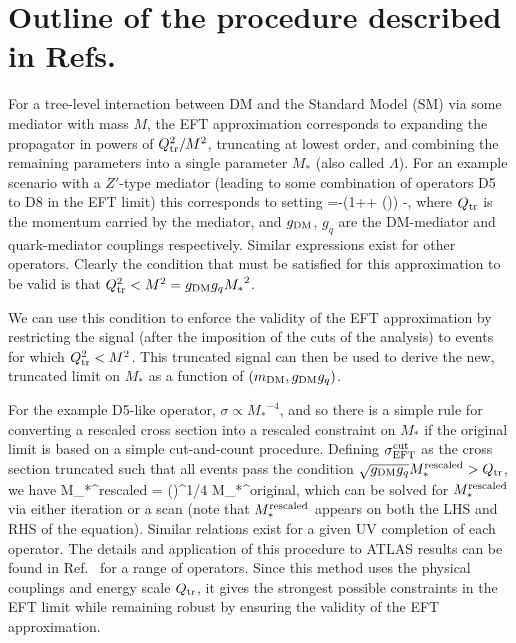 \section*{Outline of the procedure described in Refs.~\cite{Busoni:2014sya,Aad:2015zva}}

For a tree-level interaction between DM and the Standard Model (SM) via some mediator with mass $M$, the EFT approximation corresponds to expanding the propagator 
in powers of $Q_{\rm tr}^2/M^2$, truncating at lowest order, and combining the remaining parameters into a single parameter ${M_*}$ (also called $\Lambda$). For an example scenario with a $Z'$-type mediator (leading to some combination of operators D5 to D8 in the EFT limit)
this corresponds to setting
%
\be
{}=-\left(1++  \left(\right)\right) \simeq -,
\ee
%
where $Q_{\rm tr}$ is the momentum carried by the mediator, and $g_{\rm DM}$, $g_q$ are the DM-mediator and quark-mediator couplings respectively. Similar expressions exist for other operators. Clearly the condition that must be satisfied for this approximation to be valid is that $Q_{\rm tr}^2 < M^2 = g_{\rm DM} g_q {M_*}^2$. 

We can use this condition to enforce the validity of the EFT approximation by restricting the signal (after the imposition of the cuts of the analysis) to events for which $Q_{\rm tr}^2 < M^2$. This truncated signal can then be used to derive the new, truncated limit on $M_*$ as a function of $(m_{\rm DM}, g_{\rm DM} g_q)$.

For the example D5-like operator, $\sigma \propto {M_*}^{-4}$, and so there is a simple rule for converting a rescaled cross section into a rescaled constraint on ${M_*}$ if the original limit is based on a simple cut-and-count procedure. Defining $\sigma_{\rm EFT}^{\rm cut}$ as the cross section truncated such that all events pass the condition $\sqrt{g_{\rm DM} g_q} M_*^{\rm rescaled} > Q_{\rm tr}$, we have
%
\be
M_*^{\rm rescaled} = \left(\right)^{1/4} M_*^{\rm original},
\ee
%
which can be solved for $M_*^{\rm rescaled}$ via either iteration or a scan (note that $M_*^{\rm rescaled}$ appears on both the LHS and RHS of the equation). Similar relations exist for a given UV completion of each operator. The details and application of this procedure to ATLAS results can be found in Ref.~\cite{Aad:2015zva} for a range of operators. Since this method uses the physical couplings and energy scale $Q_{\rm tr}$, it gives the strongest possible constraints in the EFT limit while remaining robust by ensuring the validity of the EFT approximation. 

